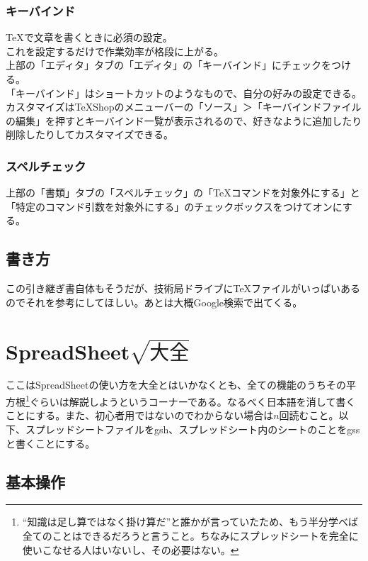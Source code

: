 \documentclass[a4paper]{ltjsreport}
\begin{document}
\subsubsection{キーバインド}
\TeX で文章を書くときに必須の設定。\\
これを設定するだけで作業効率が格段に上がる。\\
上部の「エディタ」タブの「エディタ」の「キーバインド」にチェックをつける。\\
「キーバインド」はショートカットのようなもので、自分の好みの設定できる。カスタマイズはTeXShopのメニューバーの「ソース」＞「キーバインドファイルの編集」を押すとキーバインド一覧が表示されるので、好きなように追加したり削除したりしてカスタマイズできる。
\subsubsection{スペルチェック}
上部の「書類」タブの「スペルチェック」の「\TeX コマンドを対象外にする」と「特定のコマンド引数を対象外にする」のチェックボックスをつけてオンにする。
\subsection{書き方}
この引き継ぎ書自体もそうだが、技術局ドライブに\TeX ファイルがいっぱいあるのでそれを参考にしてほしい。あとは大概Google検索で出てくる。
\section{SpreadSheet$\sqrt{大全}$}
ここはSpreadSheetの使い方を大全とはいかなくとも、全ての機能のうちその平方根\footnote{``知識は足し算ではなく掛け算だ''と誰かが言っていたため、もう半分学べば全てのことはできるだろうと言うこと。ちなみにスプレッドシートを完全に使いこなせる人はいないし、その必要はない。}ぐらいは解説しようというコーナーである。なるべく日本語を消して書くことにする。また、初心者用ではないのでわからない場合は$n$回読むこと。以下、スプレッドシートファイルをgsh、スプレッドシート内のシートのことをgssと書くことにする。
\subsection{基本操作}
\end{document}
